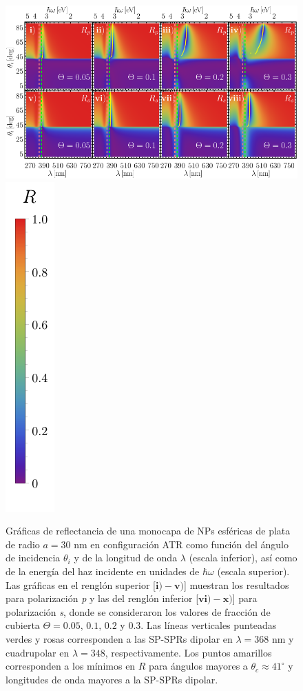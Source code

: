 \begin{figure}[h!]\centering
\includegraphics[width = .75\linewidth]{2-Resultados/figs/7-AgThetaVar/0-2D_Grid}%
\includegraphics[scale=.85, trim={00 -5 00 00}, clip]{2-Resultados/figs/0-RBar_v}
	\caption{Gráficas de reflectancia de una monocapa de NPs esféricas de plata de radio $a=30$ nm en configuración ATR como función del ángulo de incidencia $\theta_i$ y de la longitud de onda $\lambda$ (escala inferior), así como de la energía del haz incidente en unidades de $\hbar\omega$ (escala superior).  Las gráficas   en el renglón superior [$\mathbf{i)-v)}$] muestran los resultados para  polarización \emph{p} y las del renglón inferior  [$\mathbf{vi)-x)}$]  para polarización  \emph{s}, donde se consideraron los valores de fracción de cubierta $\Theta = 0.05,\,0.1,\,0.2$ y $0.3$.  Las líneas verticales punteadas verdes y rosas corresponden a las SP-SPRs dipolar en $\lambda=368$ nm y  cuadrupolar en $\lambda=348$, respectivamente.  Los puntos amarillos corresponden a los mínimos en $R$ para ángulos mayores a $\theta_c\approx 41^\circ$ y longitudes de onda mayores a la SP-SPRs dipolar.
}	\label{fig:Ag-R-Theta}	
	\end{figure}	


